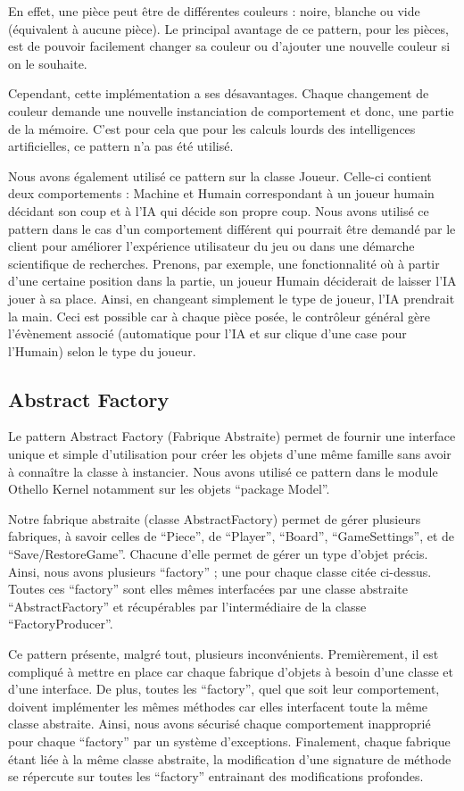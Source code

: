\documentclass[a4paper,12pt]{report}
\begin{document}
En effet, une pièce peut être de différentes couleurs : noire, blanche ou vide (équivalent à aucune pièce). Le principal avantage de ce pattern, pour les pièces, est de pouvoir facilement changer sa couleur ou d’ajouter une nouvelle couleur si on le souhaite.

Cependant, cette implémentation a ses désavantages. Chaque changement de couleur demande une nouvelle instanciation de comportement et donc, une partie de la mémoire. C’est pour cela que pour les calculs lourds des intelligences artificielles, ce pattern n’a pas été utilisé.

Nous avons également utilisé ce pattern sur la classe Joueur. Celle-ci contient deux comportements : Machine et Humain correspondant à un joueur humain décidant son coup et à l’IA qui décide son propre coup. Nous avons utilisé ce pattern dans le cas d’un comportement différent qui pourrait être demandé par le client pour améliorer l’expérience utilisateur du jeu ou dans une démarche scientifique de recherches. Prenons, par exemple, une fonctionnalité où à partir d’une certaine position dans la partie, un joueur Humain déciderait de laisser l’IA jouer à sa place. Ainsi, en changeant simplement le type de joueur, l’IA prendrait la main. Ceci est possible car à chaque pièce posée, le contrôleur général gère l’évènement associé (automatique pour l’IA et sur clique d’une case pour l’Humain) selon le type du joueur.

\subsection{Abstract Factory}

Le pattern Abstract Factory (Fabrique Abstraite) permet de fournir une interface unique et simple d’utilisation pour créer les objets d’une même famille sans avoir à connaître la classe à instancier. Nous avons utilisé ce pattern dans le module Othello Kernel notamment sur les objets “package Model”.

Notre fabrique abstraite (classe AbstractFactory) permet de gérer plusieurs fabriques, à savoir celles de “Piece”, de “Player”, “Board”, “GameSettings”, et de “Save/RestoreGame”. Chacune d’elle permet de gérer un type d’objet précis. Ainsi, nous avons plusieurs “factory” ; une pour chaque classe citée ci-dessus. Toutes ces “factory” sont elles mêmes interfacées par une classe abstraite “AbstractFactory” et récupérables par l’intermédiaire de la classe “FactoryProducer”.

Ce pattern présente, malgré tout, plusieurs inconvénients. Premièrement, il est compliqué à mettre en place car chaque fabrique d’objets à besoin d’une classe et d’une interface. De plus, toutes les “factory”, quel que soit leur comportement, doivent implémenter les mêmes méthodes car elles interfacent toute la même classe abstraite. Ainsi, nous avons sécurisé chaque comportement inapproprié pour chaque “factory” par un système d’exceptions. Finalement, chaque fabrique étant liée à la même classe abstraite, la modification d’une signature de méthode se répercute sur toutes les “factory” entrainant des modifications profondes. 
\end{document}

